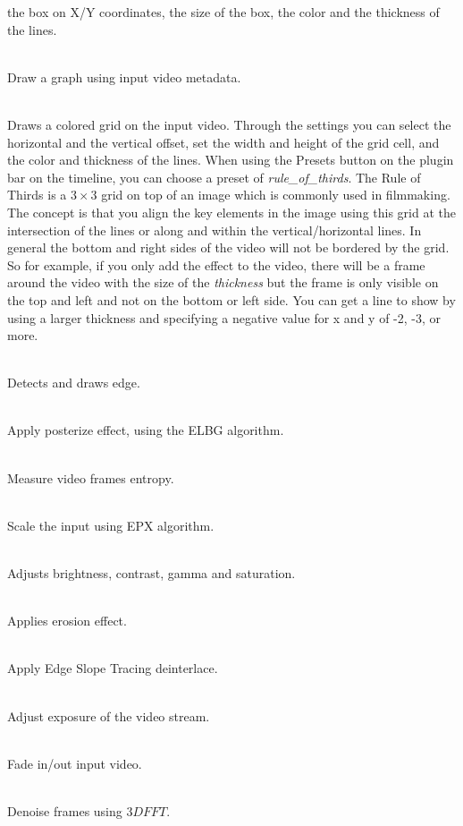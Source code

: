 \begin{description}
  the box on X/Y coordinates, the size of the box, the color and the
  thickness of the lines.
\item [F\_drawgraph]~\\Draw a graph using input video
  metadata.
\item [F\_drawgrid]~\\Draws a colored grid on the input
  video. Through the settings you can select the horizontal and the
  vertical offset, set the width and height of the grid cell, and the
  color and thickness of the lines. When using the Presets button on
  the plugin bar on the timeline, you can choose a preset of
  \textit{rule\_of\_thirds}. The Rule of Thirds is a $3\times3$ grid
  on top of an image which is commonly used in filmmaking. The concept
  is that you align the key elements in the image using this grid at
  the intersection of the lines or along and within the
  vertical/horizontal lines.  In general the bottom and right sides of
  the video will not be bordered by the grid.  So for example, if you
  only add the effect to the video, there will be a frame around the
  video with the size of the \textit{thickness}
  but the frame is only visible on the top and left and not on the bottom
  or left side.  You can get a line to show by using a larger thickness
  and specifying a negative value for x and y of -2, -3, or more. 
\item [F\_edgedetect]~\\Detects and draws edge.
\item [F\_elbg]~\\Apply posterize effect, using the ELBG
  algorithm.
\item [F\_entropy]~\\Measure video frames entropy.
\item [F\_epx]~\\Scale the input using EPX algorithm.
\item [F\_eq]~\\Adjusts brightness, contrast, gamma and
  saturation.
\item [F\_erosion]~\\Applies erosion effect.
\item [F\_estdif]~\\Apply Edge Slope Tracing deinterlace.
\item [F\_exposure]~\\Adjust exposure of the video stream.
\item [F\_fade]~\\Fade in/out input video.
\item [F\_fftdnoiz]~\\Denoise frames using $3D FFT$.

\end{description}
